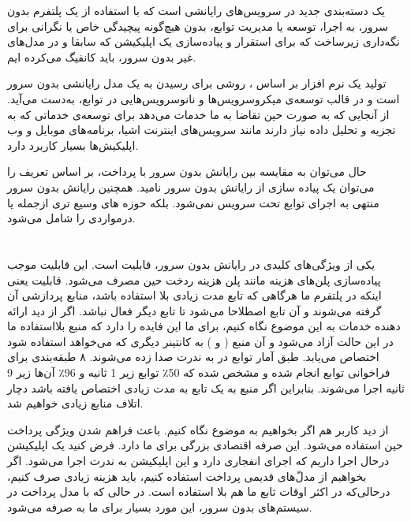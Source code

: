  یک دسته‌بندی جدید در سرویس‌های رایانشی است که با استفاده از یک پلتفرم بدون سرور، به اجرا، توسعه یا مدیریت توابع، بدون هیچ‌گونه پیچیدگی خاص یا نگرانی برای نگه‌داری زیرساخت که برای استقرار و پیاده‌سازی یک اپلیکیشن که سابقا و در مدل‌های غیر بدون سرور، باید کانفیگ می‌کرده ایم. 

تولید یک نرم افزار بر اساس ، روشی برای رسیدن به یک مدل رایانشی بدون سرور است و در قالب توسعه‌ی میکروسرویس‌ها و نانوسرویس‌هایی در توابع، به‌دست می‌آید. از آنجایی که  به صورت حین تقاضا به ما خدمات می‌دهد برای توسعه‌ی خدماتی که به تجزیه و تحلیل داده نیاز دارند مانند سرویس‌های اینترنت اشیا، برنامه‌های موبایل و وب اپلیکیش‌ها بسیار کاربرد دارد. 

حال می‌توان به مقایسه بین رایانش بدون سرور با  پرداخت، بر اساس تعریف  را می‌توان یک پیاده سازی از رایانش بدون سرور نامید. همچنین رایانش بدون سرور منتهی به اجرای توابع تحت سرویس نمی‌شود. بلکه حوزه های وسیع تری ازجمله  یا درمواردی  را شامل می‌شود. 


\section{}

یکی از ویژگی‌های کلیدی در رایانش بدون سرور، قابلیت  است. این قابلیت موجب پیاده‌سازی پلن‌های هزینه مانند پلن هزینه ردخت حین مصرف می‌شود. قابلیت  یعنی اینکه در پلتفرم ما هرگاهی که تابع مدت زیادی بلا استفاده باشد، منابع پردازشی آن گرفته می‌شوند و آن تابع اصطلاحا  می‌شود تا تابع دیگر فعال نباشد. اگر از دید ارائه دهنده خدمات به این موضوع نگاه کنیم، برای ما این فایده را دارد که منبع بلااستفاده ما در این حالت آزاد می‌شود و آن منبع ( و ) به کانتینر دیگری که می‌خواهد استفاده شود اختصاص می‌یابد. طبق آمار توابع در  به ندرت صدا زده می‌شوند. ۸ طبقه‌بندی برای فراخوانی توابع انجام شده و مشخص شده که 50٪ توابع زیر 1 ثانیه و 96٪ آن‌ها زیر 9 ثانیه اجرا می‌شوند\cite{shahrad2020serverless}. بنابراین اگر منبع به یک تابع به مدت زیادی اختصاص یافته باشد دچار اتلاف منابع زیادی خواهیم شد. 

از دید کاربر هم اگر بخواهیم به موضوع نگاه کنیم.  باعث فراهم شدن ویژگی پرداخت حین استفاده می‌شود. این صرفه اقتصادی بزرگی برای ما دارد. فرض کنید یک اپلیکیشن درحال اجرا داریم که اجرای انفجاری دارد و این اپلیکیشن به ندرت اجرا می‌شود. اگر بخواهیم از مدل‌ّهای قدیمی پرداخت استفاده کنیم، باید هزینه زیادی صرف کنیم، درحالی‌که در اکثر اوقات تابع ما هم بلا استفاده است. در حالی که با مدل پرداخت در سیستم‌های بدون سرور، این مورد بسیار برای ما به صرفه می‌شود. 

